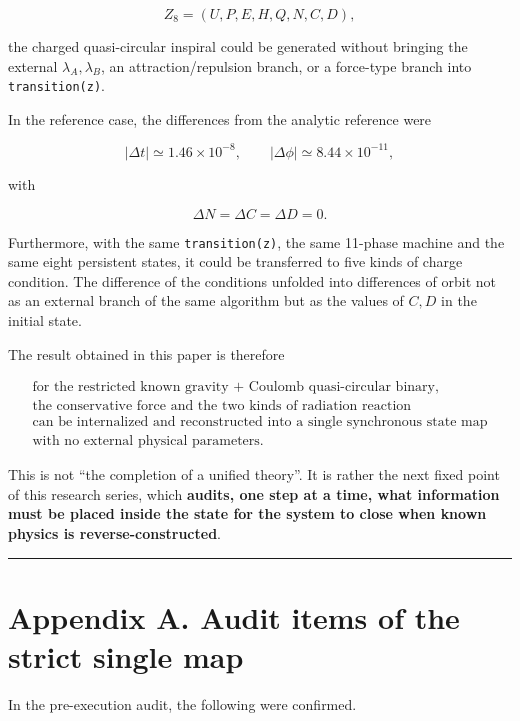 \documentclass[
  a4paper,
]{article}
\begin{document}
\[
\boxed{
Z_8=(U,P,E,H,Q,N,C,D),
}
\]

the charged quasi-circular inspiral could be generated without bringing
the external \(\lambda_A,\lambda_B\), an attraction/repulsion branch, or
a force-type branch into \texttt{transition(z)}.

In the reference case, the differences from the analytic reference were

\[
|\Delta t|\simeq1.46\times10^{-8},
\qquad
|\Delta\phi|\simeq8.44\times10^{-11},
\]

with

\[
\Delta N=\Delta C=\Delta D=0.
\]

Furthermore, with the same \texttt{transition(z)}, the same 11-phase
machine and the same eight persistent states, it could be transferred to
five kinds of charge condition. The difference of the conditions
unfolded into differences of orbit not as an external branch of the same
algorithm but as the values of \(C,D\) in the initial state.

The result obtained in this paper is therefore

\[
\boxed{
\begin{array}{c}
\text{for the restricted known gravity + Coulomb quasi-circular binary,}\\
\text{the conservative force and the two kinds of radiation reaction}\\
\text{can be internalized and reconstructed into a single synchronous state map}\\
\text{with no external physical parameters.}
\end{array}
}
\]

This is not ``the completion of a unified theory''. It is rather the
next fixed point of this research series, which \textbf{audits, one step
at a time, what information must be placed inside the state for the
system to close when known physics is reverse-constructed}.

\begin{center}\rule{0.5\linewidth}{0.5pt}\end{center}

\section{Appendix A. Audit items of the strict single
map}\label{appendix-a.-audit-items-of-the-strict-single-map}

In the pre-execution audit, the following were confirmed.
\end{document}
